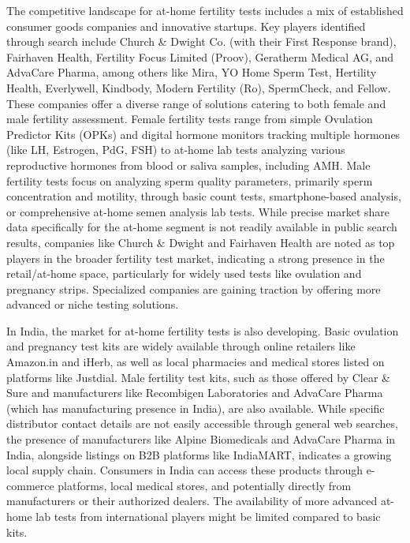 \documentclass{article}
\begin{document}
The competitive landscape for at-home fertility tests includes a mix of established consumer goods companies and innovative startups. Key players identified through search include Church \& Dwight Co. (with their First Response brand), Fairhaven Health, Fertility Focus Limited (Proov), Geratherm Medical AG, and AdvaCare Pharma, among others like Mira, YO Home Sperm Test, Hertility Health, Everlywell, Kindbody, Modern Fertility (Ro), SpermCheck, and Fellow. These companies offer a diverse range of solutions catering to both female and male fertility assessment. Female fertility tests range from simple Ovulation Predictor Kits (OPKs) and digital hormone monitors tracking multiple hormones (like LH, Estrogen, PdG, FSH) to at-home lab tests analyzing various reproductive hormones from blood or saliva samples, including AMH. Male fertility tests focus on analyzing sperm quality parameters, primarily sperm concentration and motility, through basic count tests, smartphone-based analysis, or comprehensive at-home semen analysis lab tests. While precise market share data specifically for the at-home segment is not readily available in public search results, companies like Church \& Dwight and Fairhaven Health are noted as top players in the broader fertility test market, indicating a strong presence in the retail/at-home space, particularly for widely used tests like ovulation and pregnancy strips. Specialized companies are gaining traction by offering more advanced or niche testing solutions.

In India, the market for at-home fertility tests is also developing. Basic ovulation and pregnancy test kits are widely available through online retailers like Amazon.in and iHerb, as well as local pharmacies and medical stores listed on platforms like Justdial. Male fertility test kits, such as those offered by Clear \& Sure and manufacturers like Recombigen Laboratories and AdvaCare Pharma (which has manufacturing presence in India), are also available. While specific distributor contact details are not easily accessible through general web searches, the presence of manufacturers like Alpine Biomedicals and AdvaCare Pharma in India, alongside listings on B2B platforms like IndiaMART, indicates a growing local supply chain. Consumers in India can access these products through e-commerce platforms, local medical stores, and potentially directly from manufacturers or their authorized dealers. The availability of more advanced at-home lab tests from international players might be limited compared to basic kits.
\end{document}
